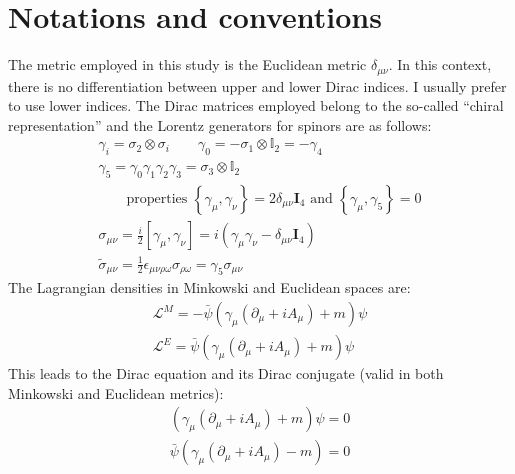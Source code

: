 \documentclass[english, LaM, oneside, noexaminfo]{sapthesis}
\begin{document}
\chapter{Notations and conventions}\label{app:notations}
\noindent
The metric employed in this study is the Euclidean metric $\delta_{\mu\nu}$.
In this context, there is no differentiation between upper and lower Dirac indices.
I usually prefer to use lower indices.
\newline\newline
The Dirac matrices employed belong to the so-called ``chiral representation'' \cite{Itzykson-Zuber} and the Lorentz generators for spinors are as follows:
\begin{equation*}
    \begin{gathered}
        \gamma_i = \sigma_2 \otimes \sigma_i \qquad \gamma_0 = - \sigma_1 \otimes \mathbb{I}_2 = -\gamma_4 \\
        \gamma_5 = \gamma_0 \gamma_1 \gamma_2 \gamma_3 = \sigma_3 \otimes \mathbb{I}_2 \\
        \qquad \text{properties } \left\{ \gamma_\mu , \gamma_\nu \right\} = 2 \delta_{\mu\nu} \mathbf{I}_4 \text{ and } \left\{ \gamma_\mu , \gamma_5 \right\} = 0 \\
        \sigma_{\mu\nu} = \frac{i}{2} \left[\gamma_\mu , \gamma_\nu\right] = i \left(\gamma_\mu \gamma_\nu - \delta_{\mu\nu} \mathbf{I}_4\right) \\
        \tilde{\sigma}_{\mu\nu} = \frac{1}{2}\epsilon_{\mu\nu\rho\omega}\sigma_{\rho\omega} = \gamma_5 \sigma_{\mu\nu} 
    \end{gathered}
\end{equation*}
The Lagrangian densities in Minkowski and Euclidean spaces are:
\begin{equation*}
    \begin{gathered}
        \mathcal{L}^M = - \bar{\psi} \left( \gamma_\mu \left( \partial_\mu + i A_\mu \right) + m \right) \psi \\
        \mathcal{L}^E = \bar{\psi} \left( \gamma_\mu \left( \partial_\mu + i A_\mu \right) + m \right) \psi
    \end{gathered}
\end{equation*}
This leads to the Dirac equation and its Dirac conjugate (valid in both Minkowski and Euclidean metrics):
\begin{equation*}
    \begin{gathered}
        \left( \gamma_\mu \left( \partial_\mu + i A_\mu \right) + m \right) \psi = 0 \\
        \bar{\psi} \left( \gamma_\mu \left( \partial_\mu + i A_\mu \right) - m \right) = 0
    \end{gathered}
\end{equation*}
\end{document}
